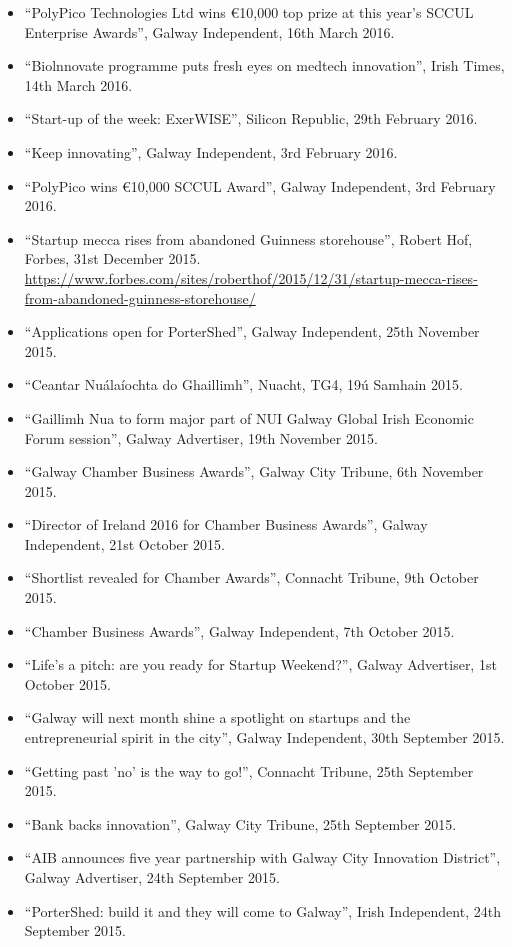 \documentclass[10pt,a4paper]{res} %
\begin{document}
\begin{resume}
{\begin{itemize}
\item ``PolyPico Technologies Ltd wins \euro{}10,000 top prize at this year's SCCUL Enterprise Awards'', Galway Independent, 16th March 2016.
\item ``Biolnnovate programme puts fresh eyes on medtech innovation'', Irish Times, 14th March 2016.
\item ``Start-up of the week: ExerWISE'', Silicon Republic, 29th February 2016.
\item ``Keep innovating'', Galway Independent, 3rd February 2016.
\item ``PolyPico wins \euro{}10,000 SCCUL Award'', Galway Independent, 3rd February 2016.
\item ``Startup mecca rises from abandoned Guinness storehouse'', Robert Hof, Forbes, 31st December 2015. \url{https://www.forbes.com/sites/roberthof/2015/12/31/startup-mecca-rises-from-abandoned-guinness-storehouse/}
\item ``Applications open for PorterShed'', Galway Independent, 25th November 2015.
\item ``Ceantar Nu\'{a}la\'{i}ochta do Ghaillimh'', Nuacht, TG4, 19\'{u} Samhain 2015.
\item ``Gaillimh Nua to form major part of NUI Galway Global Irish Economic Forum session'', Galway Advertiser, 19th November 2015.
\item ``Galway Chamber Business Awards'', Galway City Tribune, 6th November 2015.
\item ``Director of Ireland 2016 for Chamber Business Awards'', Galway Independent, 21st October 2015.
\item ``Shortlist revealed for Chamber Awards'', Connacht Tribune, 9th October 2015.
\item ``Chamber Business Awards'', Galway Independent, 7th October 2015.
\item ``Life's a pitch: are you ready for Startup Weekend?'', Galway Advertiser, 1st October 2015.
\item ``Galway will next month shine a spotlight on startups and the entrepreneurial spirit in the city'', Galway Independent, 30th September 2015.
\item ``Getting past 'no' is the way to go!'', Connacht Tribune, 25th September 2015.
\item ``Bank backs innovation'', Galway City Tribune, 25th September 2015.
\item ``AIB announces five year partnership with Galway City Innovation District'', Galway Advertiser, 24th September 2015.
\item ``PorterShed: build it and they will come to Galway'', Irish Independent, 24th September 2015.

\end{itemize}}
\end{resume}
\end{document}
